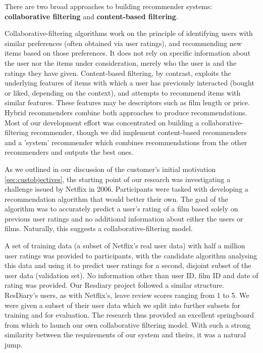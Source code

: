 \documentclass{l3proj}
\begin{document}
There are two broad approaches to building recommender systems: \textbf{collaborative filtering} and \textbf{content-based filtering}. 

Collaborative-filtering algorithms work on the principle of identifying users with similar preferences (often obtained via user ratings), and recommending new items based on those preferences. It does not rely on specific information about the user nor the items under consideration, merely who the user is and the ratings they have given. Content-based filtering, by contrast, exploits the underlying features of items with which a user has previously interacted (bought or liked, depending on the context), and attempts to recommend items with similar features. These features may be descriptors such as film length or price. Hybrid recommenders combine both approaches to produce recommendations. Most of our development effort was concentrated on building a collaborative-filtering recommender, though we did implement content-based recommenders and a 'system' recommender which combines recommendations from the other recommenders and outputs the best ones. 

As we outlined in our discussion of the customer’s initial motivation \ref{sec:custobjectives}, the starting point of our research was investigating a challenge issued by Netflix in 2006. Participants were tasked with developing a recommendation algorithm that would better their own. The goal of the algorithm was to accurately predict a user's rating of a film based solely on previous user ratings and no additional information about either the users or films. Naturally, this suggests a collaborative-filtering model.

A set of training data (a subset of Netflix's real user data) with half a million user ratings was provided to participants, with the candidate algorithm analysing this data and using it to predict user ratings for a second, disjoint subset of the user data (validation set). No information other than user ID, film ID and date of rating was provided. Our Resdiary project followed a similar structure. ResDiary's users, as with Netflix's, leave review scores ranging from 1 to 5. We were given a subset of their user data which we split into further subsets for training and for evaluation. The research thus provided an excellent springboard from which to launch our own collaborative filtering model. With such a strong similarity between the requirements of our system and theirs, it was a natural jump.
\end{document}
